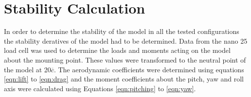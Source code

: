 \section{Stability Calculation}
In order to determine the stability of the model in all the tested configurations the stability deratives of the model had to be determined. Data from the nano 25 load cell was used to determine the loads and moments acting on the model about the mounting point. These values were transformed  to the neutral point of the model at 20$\overline{c}$. The aerodynamic coefficients were determined using equations \ref{eqn:lift} to \ref{eqn:drag} and the moment coefficients about the pitch, yaw and roll axis were calculated using Equations \ref{eqn:pitching} to \ref{eqn:yaw}. 





